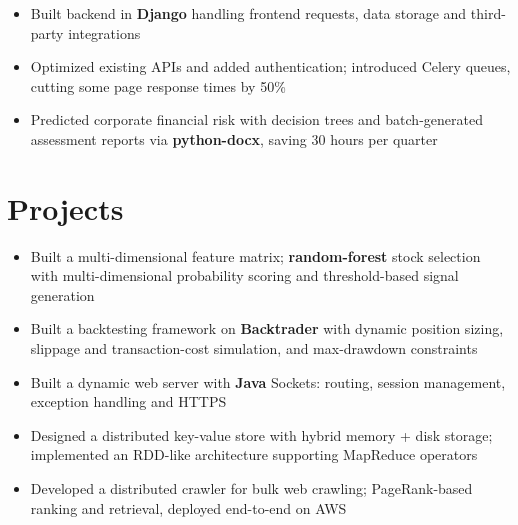 \documentclass{resume}
\begin{document}
\begin{itemize}[parsep=0.6ex]
  \item Built backend in \textbf{Django} handling frontend requests, data storage and third-party integrations
  \item Optimized existing APIs and added authentication; introduced Celery queues, cutting some page response times by 50\%
\end{itemize}

\begin{itemize}[parsep=0.6ex]
  \item Predicted corporate financial risk with decision trees and batch-generated assessment reports via \textbf{python-docx}, saving 30 hours per quarter
\end{itemize}

\section{Projects}

\begin{itemize}[parsep=0.6ex]
  \item Built a multi-dimensional feature matrix; \textbf{random-forest} stock selection with multi-dimensional probability scoring and threshold-based signal generation
  \item Built a backtesting framework on \textbf{Backtrader} with dynamic position sizing, slippage and transaction-cost simulation, and max-drawdown constraints
\end{itemize}

\begin{itemize}[parsep=0.6ex]
  \item Built a dynamic web server with \textbf{Java} Sockets: routing, session management, exception handling and HTTPS
  \item Designed a distributed key-value store with hybrid memory + disk storage; implemented an RDD-like architecture supporting MapReduce operators
  \item Developed a distributed crawler for bulk web crawling; PageRank-based ranking and retrieval, deployed end-to-end on AWS
\end{itemize}
\end{document}

